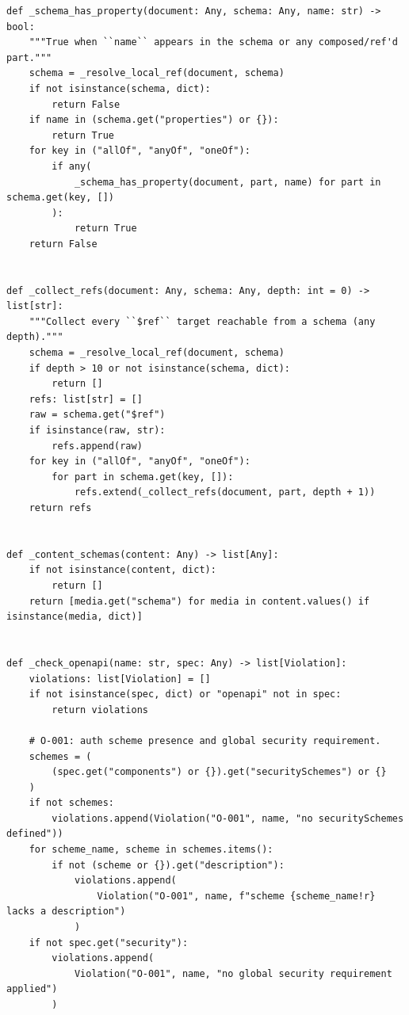 \begin{verbatim}
def _schema_has_property(document: Any, schema: Any, name: str) -> bool:
    """True when ``name`` appears in the schema or any composed/ref'd part."""
    schema = _resolve_local_ref(document, schema)
    if not isinstance(schema, dict):
        return False
    if name in (schema.get("properties") or {}):
        return True
    for key in ("allOf", "anyOf", "oneOf"):
        if any(
            _schema_has_property(document, part, name) for part in schema.get(key, [])
        ):
            return True
    return False


def _collect_refs(document: Any, schema: Any, depth: int = 0) -> list[str]:
    """Collect every ``$ref`` target reachable from a schema (any depth)."""
    schema = _resolve_local_ref(document, schema)
    if depth > 10 or not isinstance(schema, dict):
        return []
    refs: list[str] = []
    raw = schema.get("$ref")
    if isinstance(raw, str):
        refs.append(raw)
    for key in ("allOf", "anyOf", "oneOf"):
        for part in schema.get(key, []):
            refs.extend(_collect_refs(document, part, depth + 1))
    return refs


def _content_schemas(content: Any) -> list[Any]:
    if not isinstance(content, dict):
        return []
    return [media.get("schema") for media in content.values() if isinstance(media, dict)]


def _check_openapi(name: str, spec: Any) -> list[Violation]:
    violations: list[Violation] = []
    if not isinstance(spec, dict) or "openapi" not in spec:
        return violations

    # O-001: auth scheme presence and global security requirement.
    schemes = (
        (spec.get("components") or {}).get("securitySchemes") or {}
    )
    if not schemes:
        violations.append(Violation("O-001", name, "no securitySchemes defined"))
    for scheme_name, scheme in schemes.items():
        if not (scheme or {}).get("description"):
            violations.append(
                Violation("O-001", name, f"scheme {scheme_name!r} lacks a description")
            )
    if not spec.get("security"):
        violations.append(
            Violation("O-001", name, "no global security requirement applied")
        )


\end{verbatim}
